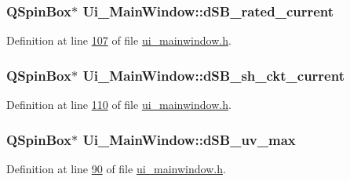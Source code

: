 \hypertarget{a00080_ab6d7c3a292c79cd73aff8735df48d30e}{
\subsubsection[{d\+S\+B\+\_\+rated\+\_\+current}]{\setlength{\rightskip}{0pt plus 5cm}Q\+Spin\+Box$\ast$ Ui\+\_\+\+Main\+Window\+::d\+S\+B\+\_\+rated\+\_\+current}}\label{a00080_ab6d7c3a292c79cd73aff8735df48d30e}


Definition at line \hyperlink{a00139_source_l00107}{107} of file \hyperlink{a00139_source}{ui\+\_\+mainwindow.\+h}.

\hypertarget{a00080_aab5fcfd5ceedb9c4e853139113f5c753}{
\subsubsection[{d\+S\+B\+\_\+sh\+\_\+ckt\+\_\+current}]{\setlength{\rightskip}{0pt plus 5cm}Q\+Spin\+Box$\ast$ Ui\+\_\+\+Main\+Window\+::d\+S\+B\+\_\+sh\+\_\+ckt\+\_\+current}}\label{a00080_aab5fcfd5ceedb9c4e853139113f5c753}


Definition at line \hyperlink{a00139_source_l00110}{110} of file \hyperlink{a00139_source}{ui\+\_\+mainwindow.\+h}.

\hypertarget{a00080_aa2872ada374dace81c4f1cc41d8e244d}{
\subsubsection[{d\+S\+B\+\_\+uv\+\_\+max}]{\setlength{\rightskip}{0pt plus 5cm}Q\+Spin\+Box$\ast$ Ui\+\_\+\+Main\+Window\+::d\+S\+B\+\_\+uv\+\_\+max}}\label{a00080_aa2872ada374dace81c4f1cc41d8e244d}


Definition at line \hyperlink{a00139_source_l00090}{90} of file \hyperlink{a00139_source}{ui\+\_\+mainwindow.\+h}.


